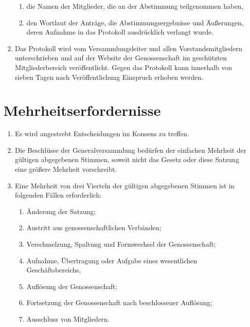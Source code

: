 \documentclass[a4paper, 12pt]{scrartcl}
\begin{document}
\begin{enumerate}
\begin{enumerate}
    \item die Namen der Mitglieder, die an der Abstimmung teilgenommen haben,
    \item den Wortlaut der Anträge, die Abstimmungsergebnisse und Äußerungen, deren Aufnahme in das Protokoll ausdrücklich verlangt wurde.
  \end{enumerate}
  \item Das Protokoll wird vom Versammlungsleiter und allen Vorstandsmitgliedern unterschrieben und auf der Website der Genossenschaft im geschützten Mitgliederbereich veröffentlicht. Gegen das Protokoll kann innerhalb von sieben Tagen nach Veröffentlichung Einspruch erhoben werden.
\end{enumerate}

\section{Mehrheitserfordernisse}
\begin{enumerate}
  \item Es wird angestrebt Entscheidungen im Konsens zu treffen.
  \item Die Beschlüsse der Generalversammlung bedürfen der einfachen Mehrheit der gültigen abgegebenen Stimmen, soweit nicht das Gesetz oder diese Satzung eine größere Mehrheit vorschreibt.
  \item Eine Mehrheit von drei Vierteln der gültigen abgegebenen Stimmen ist in folgenden Fällen erforderlich:
  \begin{enumerate}
    \item Änderung der Satzung;
    \item Austritt aus genossenschaftlichen Verbänden;
    \item Verschmelzung, Spaltung und Formwechsel der Genossenschaft;
    \item Aufnahme, Übertragung oder Aufgabe eines wesentlichen Geschäftsbereichs,
    \item Auflösung der Genossenschaft;
    \item Fortsetzung der Genossenschaft nach beschlossener Auflösung;
    \item Ausschluss von Mitgliedern.
  \end{enumerate}
\end{enumerate}
\end{document}
